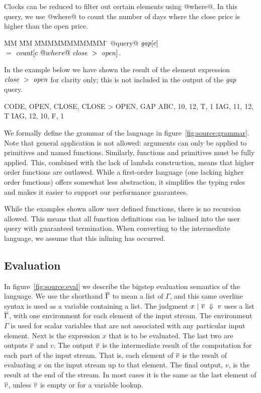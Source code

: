 Clocks can be reduced to filter out certain elements using @where@.
In this query, we use @where@ to count the number of days where the close price is higher than the open price.
\begin{tabbing}
MM \= MM \= MMMMMMMMMMM \= \kill
@query@ 
$\mathit{gap}[c]$                                        \\
 \> $=$  \> $\mathit{count}[c~@where@~\mathit{close}~>~\mathit{open}]$.       \\
\end{tabbing}

In the example below we have shown the result of the element expression $\mathit{close}~>~\mathit{open}$ for clarity only; this is not included in the output of the $\mathit{gap}$ query.
\begin{code}
CODE, OPEN, CLOSE, CLOSE > OPEN, GAP
ABC,    10,    12,            T,   1
IAG,    11,    12,            T
IAG,    12,    10,            F,   1
\end{code}


We formally define the grammar of the language in figure~\ref{fig:source:grammar}.
Note that general application is not allowed: arguments can only be applied to primitives and named functions.
Similarly, functions and primitives must be fully applied.
This, combined with the lack of lambda construction, means that higher order functions are outlawed.
While a first-order language (one lacking higher order functions) offers somewhat less abstraction, it simplifies the typing rules and makes it easier to support our performance guarantees.

While the examples shown allow user defined functions, there is no recursion allowed.
This means that all function definitions can be inlined into the user query with guaranteed termination.
When converting to the intermediate language, we assume that this inlining has occurred.

\subsection{Evaluation}



In figure~\ref{fig:source:eval} we describe the bigstep evaluation semantics of the language.
We use the shorthand $\overline{\Gamma}$ to mean a list of $\Gamma$, and this same overline syntax is used as a variable containing a list.
The judgment $x ~|~ \overline{v} ~\Downarrow~ v$ uses a list $\overline{\Gamma}$, with one environment for each element of the input stream.
The environment $\Gamma$ is used for scalar variables that are not associated with any particular input element.
Next is the expression $x$ that is to be evaluated.
The last two are outputs $\overline{v}$ and $v$.
The output $\overline{v}$ is the intermediate result of the computation for each part of the input stream.
That is, each element of $\overline{v}$ is the result of evaluating $x$ on the input stream up to that element.
The final output, $v$, is the result at the end of the stream.
In most cases it is the same as the last element of $\overline{v}$, unless $\overline{v}$ is empty or for a variable lookup.


